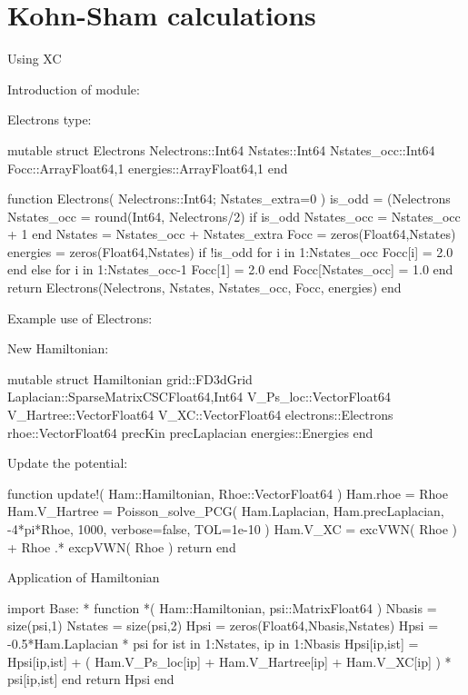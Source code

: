 \section{Kohn-Sham calculations}

Using XC

Introduction of module:

Electrons type:
\begin{juliacode}
mutable struct Electrons
  Nelectrons::Int64
  Nstates::Int64
  Nstates_occ::Int64
  Focc::Array{Float64,1}
  energies::Array{Float64,1}
end
\end{juliacode}

\begin{juliacode}
function Electrons( Nelectrons::Int64; Nstates_extra=0 )
  is_odd = (Nelectrons%
  Nstates_occ = round(Int64, Nelectrons/2)
  if is_odd
      Nstates_occ = Nstates_occ + 1
  end
  Nstates = Nstates_occ + Nstates_extra
  Focc = zeros(Float64,Nstates)
  energies = zeros(Float64,Nstates)
  if !is_odd
    for i in 1:Nstates_occ
      Focc[i] = 2.0 
    end
  else
    for i in 1:Nstates_occ-1
      Focc[1] = 2.0
    end
    Focc[Nstates_occ] = 1.0
  end
  return Electrons(Nelectrons, Nstates, Nstates_occ, Focc, energies)
end
\end{juliacode}

Example use of Electrons:

New Hamiltonian:
\begin{juliacode}
mutable struct Hamiltonian
  grid::FD3dGrid
  Laplacian::SparseMatrixCSC{Float64,Int64}
  V_Ps_loc::Vector{Float64}
  V_Hartree::Vector{Float64}
  V_XC::Vector{Float64}
  electrons::Electrons
  rhoe::Vector{Float64}
  precKin
  precLaplacian
  energies::Energies
end
\end{juliacode}


Update the potential:

\begin{juliacode}
function update!( Ham::Hamiltonian, Rhoe::Vector{Float64} )
  Ham.rhoe = Rhoe
  Ham.V_Hartree = Poisson_solve_PCG( Ham.Laplacian, Ham.precLaplacian,
    -4*pi*Rhoe, 1000, verbose=false, TOL=1e-10 )
  Ham.V_XC = excVWN( Rhoe ) + Rhoe .* excpVWN( Rhoe )
  return
end
\end{juliacode}

Application of Hamiltonian

\begin{juliacode}
import Base: *
function *( Ham::Hamiltonian, psi::Matrix{Float64} )
  Nbasis = size(psi,1)
  Nstates = size(psi,2)
  Hpsi = zeros(Float64,Nbasis,Nstates)
  Hpsi = -0.5*Ham.Laplacian * psi
  for ist in 1:Nstates, ip in 1:Nbasis
    Hpsi[ip,ist] = Hpsi[ip,ist] + ( Ham.V_Ps_loc[ip] + Ham.V_Hartree[ip] +
                   Ham.V_XC[ip] ) * psi[ip,ist]
  end
  return Hpsi
end
\end{juliacode}